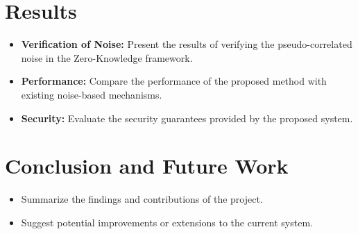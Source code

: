 \documentclass[11pt]{article}
\begin{document}
\section{Results}
\begin{itemize}
    \item \textbf{Verification of Noise:} Present the results of verifying the pseudo-correlated noise in the Zero-Knowledge framework.
    \item \textbf{Performance:} Compare the performance of the proposed method with existing noise-based mechanisms.
    \item \textbf{Security:} Evaluate the security guarantees provided by the proposed system.
\end{itemize}

\section{Conclusion and Future Work}
\begin{itemize}
    \item Summarize the findings and contributions of the project.
    \item Suggest potential improvements or extensions to the current system.
\end{itemize}



\end{document}
